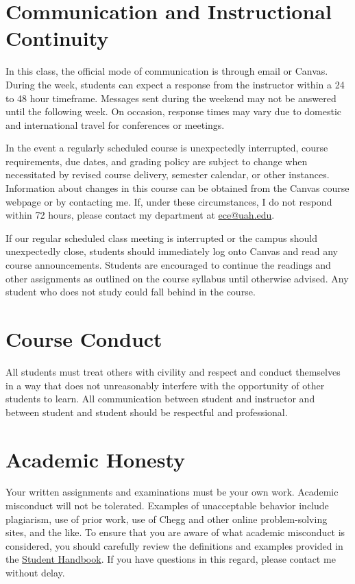 \documentclass[11pt,oneside,openany]{book}
\begin{document}
\chapter{Communication and Instructional Continuity}
In this class, the official mode of communication is through email or Canvas. During the week, students can expect a response from the instructor within a 24 to 48 hour timeframe. Messages sent during the weekend may not be answered until the following week. On occasion, response times may vary due to domestic and international travel for conferences or meetings.

In the event a regularly scheduled course is unexpectedly interrupted, course requirements, due dates, and grading policy are subject to change when necessitated by revised course delivery, semester calendar, or other instances. Information about changes in this course can be obtained from the Canvas course webpage or by contacting me. If, under these circumstances, I do not respond within 72 hours, please contact my department at \href{mailto:ece@uah.edu}{ece@uah.edu}.

If our regular scheduled class meeting is interrupted or the campus should unexpectedly close, students should immediately log onto Canvas and read any course announcements. Students are encouraged to continue the readings and other assignments as outlined on the course syllabus until otherwise advised. Any student who does not study could fall behind in the course.

\chapter{Course Conduct}
All students must treat others with civility and respect and conduct themselves in a way that does not unreasonably interfere with the opportunity of other students to learn. All communication between student and instructor and between student and student should be respectful and professional.

\chapter{Academic Honesty}
Your written assignments and examinations must be your own work. Academic misconduct will not be tolerated. Examples of unacceptable behavior include plagiarism, use of prior work, use of Chegg and other online problem-solving sites, and the like. To ensure that you are aware of what academic misconduct is considered, you should carefully review the definitions and examples provided in the \href{https://www.uah.edu/dos/office-of-student-ethics-education/handbook}{Student Handbook}. If you have questions in this regard, please contact me without delay.
\end{document}
